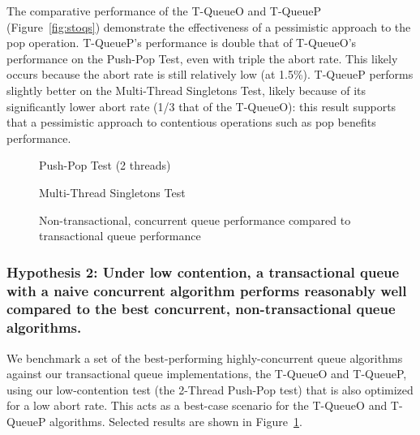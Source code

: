 The comparative performance of the T-QueueO and T-QueueP (Figure~\ref{fig:stoqs}) demonstrate the effectiveness of a pessimistic approach to the pop operation. T-QueueP's performance is double that of T-QueueO's performance on the Push-Pop Test, even with triple the abort rate. This likely occurs because the abort rate is still relatively low (at 1.5\%). T-QueueP performs slightly better on the Multi-Thread Singletons Test, likely because of its significantly lower abort rate (1/3 that of the T-QueueO): this result supports that a pessimistic approach to contentious operations such as pop benefits performance. 

\vspace{12pt}
\noindent{}

\begin{figure}[H]
    \centering
	\begin{minipage}{0.75\textwidth}
        \caption*{Push-Pop Test (2 threads)}
        \vspace{12pt}
	\end{minipage}
   	\begin{minipage}{0.75\textwidth}
        \caption*{Multi-Thread Singletons Test}
	\end{minipage}
        \caption{Non-transactional, concurrent queue performance compared to transactional queue performance}
    \label{fig:ntqs}
\end{figure}

\subsubsection{Hypothesis 2: Under low contention, a transactional queue with a naive concurrent algorithm performs reasonably well compared to the best concurrent, non-transactional queue algorithms.}

We benchmark a set of the best-performing highly-concurrent queue algorithms against our transactional queue implementations, the T-QueueO and T-QueueP, using our low-contention test (the 2-Thread Push-Pop test) that is also optimized for a low abort rate. This acts as a best-case scenario for the T-QueueO and T-QueueP algorithms. Selected results are shown in Figure~\ref{fig:ntqs}.

